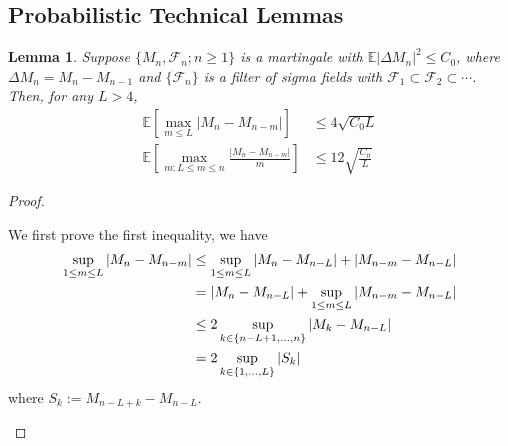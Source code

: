 \documentclass[11pt]{article}
\theoremstyle{plain}
\newtheorem{lemma}[theorem]{Lemma}
\theoremstyle{definition}
\begin{document}
\begin{appendix}
\subsection{Probabilistic Technical Lemmas}
\begin{lemma}\label{lem:mart-1}
	Suppose $\{M_n, \mathcal{F}_n; n \geq 1\}$ is a martingale with $\mathbb{E}|\Delta M_n|^2 \leq C_0$, where $\Delta M_n = M_n - M_{n-1}$ and $\{\mathcal{F}_n\}$ is a filter of sigma fields with $\mathcal{F}_1 \subset \mathcal{F}_2 \subset \cdots$. Then, for any $L > 4$,
	\begin{align}
		\mathbb{E} \left[ \max_{m \leq L} |M_n - M_{n - m}| \right] 
		&\leq 4\sqrt{C_0 L}\label{eq:A1}\\
		\mathbb{E} \left[ \max_{m : L \leq m \leq n} \frac{|M_n - M_{n - m}|}{m} \right] 
		&\leq 12 \sqrt{\frac{C_0}{L}} \label{eq:A2}
	\end{align}
\end{lemma}
\begin{proof}
	\begin{enumerate}[label=(\roman*)]
		We first prove the first inequality, we have 
		\begin{align}
			\sup_{1 \le m \le L} |M_n - M_{n-m}| 
			&\le \sup_{1 \le m \le L} |M_n - M_{n-L}| + |M_{n-m} - M_{n-L}|\\
			&= |M_n - M_{n-L}| + \sup_{1 \le m \le L} |M_{n-m} - M_{n-L}|\notag\\
			&\le 2 \sup_{k \in \{n-L+1, \dots, n\}} |M_k - M_{n-L}|\notag\\
			&= 2 \sup_{k \in \{1, \dots, L\}} |S_k|\label{eq:doob-2}
		\end{align}
		where \(S_k := M_{n-L+k} - M_{n-L}.\) 
		

\end{enumerate}
\end{proof}
\end{appendix}
\end{document}
